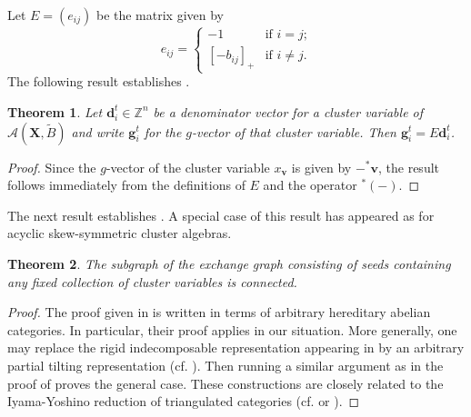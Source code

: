 \documentclass[12pt]{amsart}
\newtheorem{theorem}{Theorem}
\newcommand{\bfd}{\mathbf{d}}
\newcommand{\bfg}{\mathbf{g}}
\newcommand{\bfv}{\mathbf{v}}
\newcommand{\bfX}{\mathbf{X}}
\newcommand{\cA}{\mathcal{A}}
\newcommand{\ZZ}{\mathbb{Z}}
\begin{document}
  Let $E=(e_{ij})$ be the matrix given by
  \[e_{ij}=\begin{cases} -1 & \text{if $i=j$;}\\ [-b_{ij}]_+ & \text{if $i\ne j$.}\end{cases}\]
  The following result establishes \cite[Conj. 3.21]{reading-speyer}.
  \begin{theorem}
    \label{th:d to g}
    Let $\bfd_i^t\in\ZZ^n$ be a denominator vector for a cluster variable of $\cA(\bfX,\tilde B)$ and write $\bfg_i^t$ for the $g$-vector of that cluster variable.  Then $\bfg_i^t=E\bfd_i^t$.
  \end{theorem}
  \begin{proof}
    Since the $g$-vector of the cluster variable $x_\bfv$ is given by $-{}^*\bfv$, the result follows immediately from the definitions of $E$ and the operator ${}^*(-)$.
  \end{proof}

  The next result establishes \cite[Conj. 3.9, 3.10]{reading-speyer}.
  A special case of this result has appeared as \cite[Cor. 3]{caldero-keller2} for acyclic skew-symmetric cluster algebras.
  \begin{theorem}
    The subgraph of the exchange graph consisting of seeds containing any fixed collection of cluster variables is connected.
  \end{theorem}
  \begin{proof}
    The proof given in \cite{caldero-keller2} is written in terms of arbitrary hereditary abelian categories.
    In particular, their proof applies in our situation.
    More generally, one may replace the rigid indecomposable representation appearing in \cite[Section 5.4]{caldero-keller2} by an arbitrary partial tilting representation (cf. \cite[Prop. 3]{happel-rickard-schofield}).
    Then running a similar argument as in the proof of \cite[Thm. 6]{caldero-keller2} proves the general case.
    These constructions are closely related to the Iyama-Yoshino reduction of triangulated categories (cf. \cite[Sec. 4]{iyama-yoshino} or \cite[Sec. 7.2]{keller}).
  \end{proof}
\end{document}
